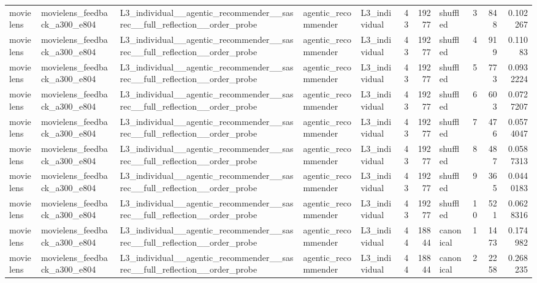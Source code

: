\begin{table}[htbp!]
\begin{tabular}{lllllrrlrrr}
movielens & movielens\_feedback\_a300\_e804 & L3\_individual\_\_agentic\_recommender\_\_sasrec\_\_full\_reflection\_\_order\_probe & agentic\_recommender & L3\_individual & 43 & 19277 & shuffled & 3 & 848 & 0.102267 \\
movielens & movielens\_feedback\_a300\_e804 & L3\_individual\_\_agentic\_recommender\_\_sasrec\_\_full\_reflection\_\_order\_probe & agentic\_recommender & L3\_individual & 43 & 19277 & shuffled & 4 & 919 & 0.11083 \\
movielens & movielens\_feedback\_a300\_e804 & L3\_individual\_\_agentic\_recommender\_\_sasrec\_\_full\_reflection\_\_order\_probe & agentic\_recommender & L3\_individual & 43 & 19277 & shuffled & 5 & 773 & 0.0932224 \\
movielens & movielens\_feedback\_a300\_e804 & L3\_individual\_\_agentic\_recommender\_\_sasrec\_\_full\_reflection\_\_order\_probe & agentic\_recommender & L3\_individual & 43 & 19277 & shuffled & 6 & 603 & 0.0727207 \\
movielens & movielens\_feedback\_a300\_e804 & L3\_individual\_\_agentic\_recommender\_\_sasrec\_\_full\_reflection\_\_order\_probe & agentic\_recommender & L3\_individual & 43 & 19277 & shuffled & 7 & 476 & 0.0574047 \\
movielens & movielens\_feedback\_a300\_e804 & L3\_individual\_\_agentic\_recommender\_\_sasrec\_\_full\_reflection\_\_order\_probe & agentic\_recommender & L3\_individual & 43 & 19277 & shuffled & 8 & 487 & 0.0587313 \\
movielens & movielens\_feedback\_a300\_e804 & L3\_individual\_\_agentic\_recommender\_\_sasrec\_\_full\_reflection\_\_order\_probe & agentic\_recommender & L3\_individual & 43 & 19277 & shuffled & 9 & 365 & 0.0440183 \\
movielens & movielens\_feedback\_a300\_e804 & L3\_individual\_\_agentic\_recommender\_\_sasrec\_\_full\_reflection\_\_order\_probe & agentic\_recommender & L3\_individual & 43 & 19277 & shuffled & 10 & 521 & 0.0628316 \\
movielens & movielens\_feedback\_a300\_e804 & L3\_individual\_\_agentic\_recommender\_\_sasrec\_\_full\_reflection\_\_order\_probe & agentic\_recommender & L3\_individual & 44 & 18844 & canonical & 1 & 1473 & 0.174982 \\
movielens & movielens\_feedback\_a300\_e804 & L3\_individual\_\_agentic\_recommender\_\_sasrec\_\_full\_reflection\_\_order\_probe & agentic\_recommender & L3\_individual & 44 & 18844 & canonical & 2 & 2258 & 0.268235 \\

\end{tabular}
\end{table}

